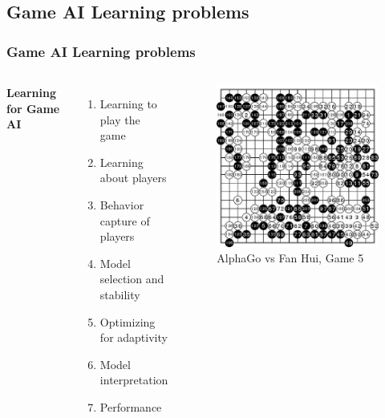 \documentclass{beamer}
\begin{document}
\subsection{Game AI Learning problems}
\begin{frame}
\frametitle{Game AI Learning problems}
\begin{columns}[c] %

\textbf{Learning for Game AI\cite{10}}
\begin{enumerate}
\item Learning to play the game
\item Learning about players
\item Behavior capture of players
\item Model selection and stability
\item Optimizing for adaptivity
\item Model interpretation
\item Performance
\end{enumerate}

\begin{figure}
  \includegraphics[width=0.8\linewidth]{figure/alphago}
  \caption{AlphaGo vs Fan Hui, Game 5}
\end{figure}
\end{columns}
\end{frame}
\end{document}
